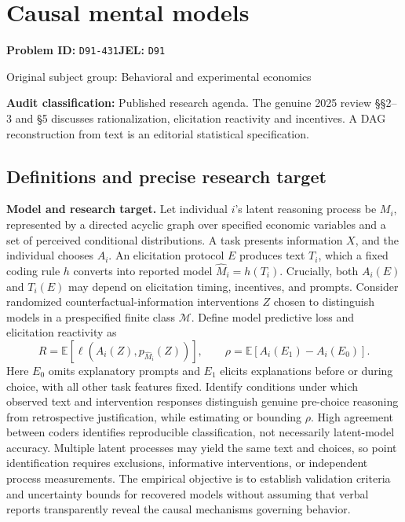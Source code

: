 \documentclass[11pt,a4paper]{article}
\begin{document}
\section*{Causal mental models}
\textbf{Problem ID:} \texttt{D91-431}\quad \textbf{JEL:} \texttt{D91}\par
\label{problem:OP-0304}
\label{audited:ECON-023}
{\sffamily\small\color{muted}Original subject group: Behavioral and experimental economics\par}
\label{definitions:problem:30007586}
\textbf{Audit classification:} Published research agenda. The genuine 2025 review §§2–3 and §5 discusses rationalization, elicitation reactivity and incentives. A DAG reconstruction from text is an editorial statistical specification.
\subsection*{Definitions and precise research target}
\textbf{Model and research target.} Let individual \(i\)'s latent reasoning process be \(M_i\), represented by a directed acyclic graph over specified economic variables and a set of perceived conditional distributions. A task presents information \(X\), and the individual chooses \(A_i\). An elicitation protocol \(E\) produces text \(T_i\), which a fixed coding rule \(h\) converts into reported model \(\widehat M_i=h(T_i)\). Crucially, both \(A_i(E)\) and \(T_i(E)\) may depend on elicitation timing, incentives, and prompts. Consider randomized counterfactual-information interventions \(Z\) chosen to distinguish models in a prespecified finite class \(\mathcal M\). Define model predictive loss and elicitation reactivity as
\[R=\mathbb E[\ell(A_i(Z),p_{\widehat M_i}(Z))],\qquad \rho=\mathbb E[A_i(E_1)-A_i(E_0)].\]
Here \(E_0\) omits explanatory prompts and \(E_1\) elicits explanations before or during choice, with all other task features fixed. Identify conditions under which observed text and intervention responses distinguish genuine pre-choice reasoning from retrospective justification, while estimating or bounding \(\rho\). High agreement between coders identifies reproducible classification, not necessarily latent-model accuracy. Multiple latent processes may yield the same text and choices, so point identification requires exclusions, informative interventions, or independent process measurements. The empirical objective is to establish validation criteria and uncertainty bounds for recovered models without assuming that verbal reports transparently reveal the causal mechanisms governing behavior.
\end{document}
